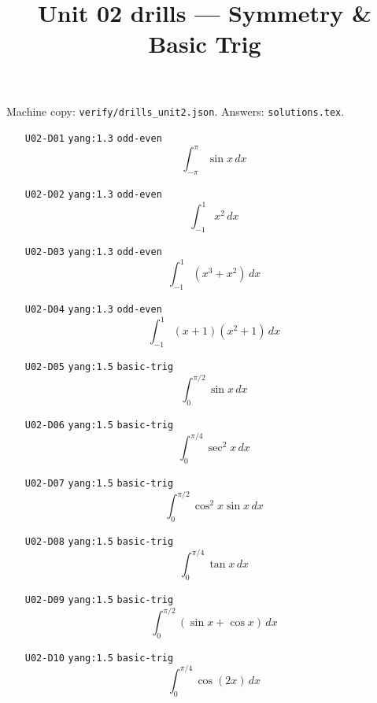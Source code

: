 
\title{Unit 02 drills --- Symmetry \& Basic Trig}
\author{}
\date{}

\maketitle
\noindent Machine copy: \texttt{verify/drills\_unit2.json}. Answers: \texttt{solutions.tex}.

\begin{enumerate}
\item[\texttt{U02-D01}] \texttt{yang:1.3} \texttt{odd-even}
\[ \int_{-\pi}^{\pi} \sin x\,dx \]
\item[\texttt{U02-D02}] \texttt{yang:1.3} \texttt{odd-even}
\[ \int_{-1}^{1} x^2\,dx \]
\item[\texttt{U02-D03}] \texttt{yang:1.3} \texttt{odd-even}
\[ \int_{-1}^{1} (x^3+x^2)\,dx \]
\item[\texttt{U02-D04}] \texttt{yang:1.3} \texttt{odd-even}
\[ \int_{-1}^{1} (x+1)(x^2+1)\,dx \]
\item[\texttt{U02-D05}] \texttt{yang:1.5} \texttt{basic-trig}
\[ \int_0^{\pi/2} \sin x\,dx \]
\item[\texttt{U02-D06}] \texttt{yang:1.5} \texttt{basic-trig}
\[ \int_0^{\pi/4} \sec^2 x\,dx \]
\item[\texttt{U02-D07}] \texttt{yang:1.5} \texttt{basic-trig}
\[ \int_0^{\pi/2} \cos^2 x\sin x\,dx \]
\item[\texttt{U02-D08}] \texttt{yang:1.5} \texttt{basic-trig}
\[ \int_0^{\pi/4} \tan x\,dx \]
\item[\texttt{U02-D09}] \texttt{yang:1.5} \texttt{basic-trig}
\[ \int_0^{\pi/2} (\sin x+\cos x)\,dx \]
\item[\texttt{U02-D10}] \texttt{yang:1.5} \texttt{basic-trig}
\[ \int_0^{\pi/4} \cos(2x)\,dx \]
\end{enumerate}

